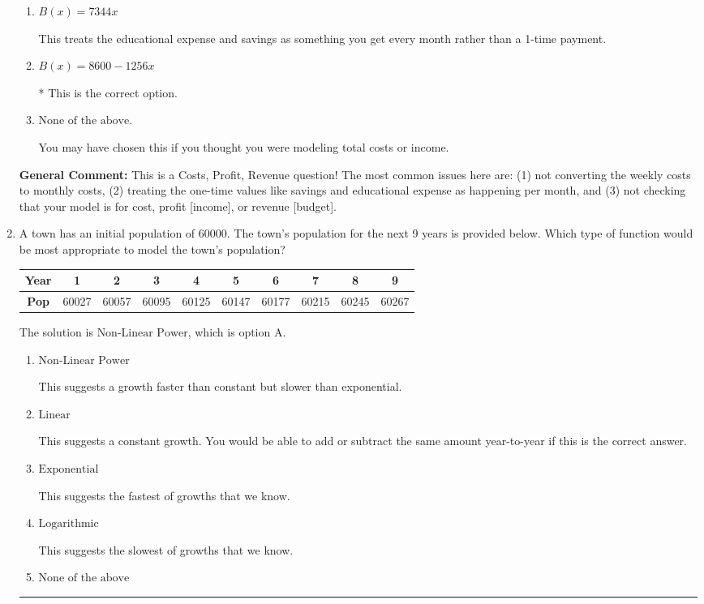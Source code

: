 \documentclass{extbook}[14pt]
\newcommand{\litem}[1]{\item #1

\rule{\textwidth}{0.4pt}}
\begin{document}
\begin{enumerate}
{\begin{enumerate}[label=\Alph*.]
This treats the educational expense and savings as something you get every month rather than a 1-time payment AND treats weekly expenses as month expenses rather than multiplying each weekly expense by 4.
\item \( B(x) = 7344 x \)

This treats the educational expense and savings as something you get every month rather than a 1-time payment.
\item \( B(x) = 8600 - 1256 x \)

* This is the correct option.
\item \( \text{None of the above.} \)

You may have chosen this if you thought you were modeling total costs or income.
\end{enumerate}

\textbf{General Comment:} This is a Costs, Profit, Revenue question! The most common issues here are: (1) not converting the weekly costs to monthly costs, (2) treating the one-time values like savings and educational expense as happening per month, and (3) not checking that your model is for cost, profit [income], or revenue [budget].
}
\litem{
A town has an initial population of 60000. The town's population for the next 9 years is provided below. Which type of function would be most appropriate to model the town's population?


\begin{tabular}{c|c|c|c|c|c|c|c|c|c}
\textbf{Year} &1 &2 &3 &4 &5 &6 &7 &8 &9\tabularnewline \hline
\textbf{Pop} &60027 &60057 &60095 &60125 &60147 &60177 &60215 &60245 &60267\end{tabular}The solution is \( \text{Non-Linear Power} \), which is option A.\begin{enumerate}[label=\Alph*.]
\item \( \text{Non-Linear Power} \)

This suggests a growth faster than constant but slower than exponential.
\item \( \text{Linear} \)

This suggests a constant growth. You would be able to add or subtract the same amount year-to-year if this is the correct answer.
\item \( \text{Exponential} \)

This suggests the fastest of growths that we know.
\item \( \text{Logarithmic} \)

This suggests the slowest of growths that we know.
\item \( \text{None of the above} \)


\end{enumerate}}
\end{enumerate}
\end{document}
